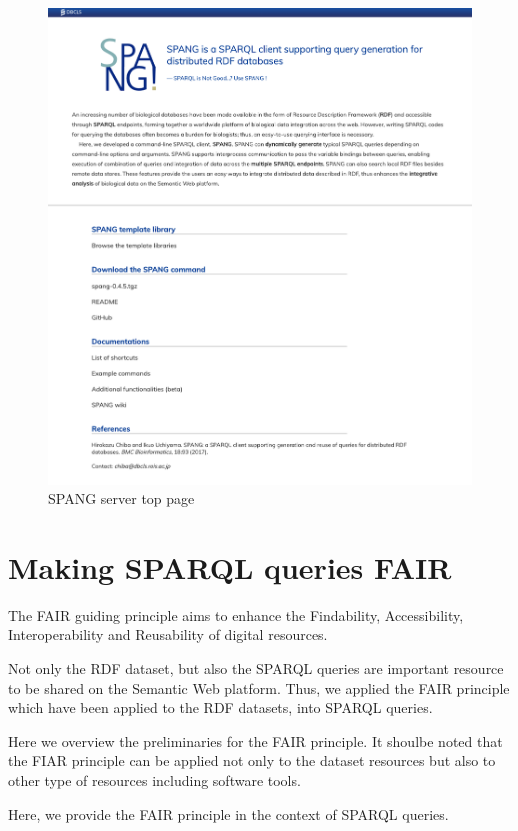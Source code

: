 \documentclass[runningheads]{llncs}
\begin{document}
\begin{figure}
\center
\includegraphics[width=1.0\textwidth]{spang_top.png}
\caption{SPANG server top page}
\label{fig:spang_top}
\end{figure}


\section{Making SPARQL queries FAIR}

The FAIR guiding principle aims to enhance the Findability, Accessibility, Interoperability and Reusability of digital resources.

Not only the RDF dataset, but also the SPARQL queries are important resource to be shared on the Semantic Web platform. Thus, we applied the FAIR principle which have been applied to the RDF datasets, into SPARQL queries.

Here we overview the preliminaries for the FAIR principle.
It shoulbe noted that the FIAR principle can be applied not only to the dataset resources but also to other type of resources including software tools.

Here, we provide the FAIR principle in the context of SPARQL queries.
\end{document}
